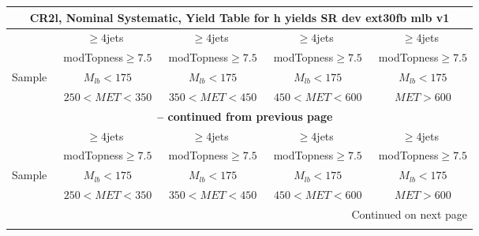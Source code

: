 \documentclass{article}
\begin{document}
 
 
\begin{longtable}{|l|c|c|c|c|} 
 
\multicolumn{5}{c}{ CR2l, Nominal Systematic, Yield Table for h yields SR dev ext30fb mlb v1 }\\* \hline 
  & $\ge4$jets  & $\ge4$jets  & $\ge4$jets  & $\ge4$jets \\* 
  & ~modTopness$\ge7.5$  & ~modTopness$\ge7.5$  & ~modTopness$\ge7.5$  & ~modTopness$\ge7.5$ \\* 
Sample  & ~$M_{lb}<175$  & ~$M_{lb}<175$  & ~$M_{lb}<175$  & ~$M_{lb}<175$ \\* 
  & ~$250<MET<350$  & ~$350<MET<450$  & ~$450<MET<600$  & ~$MET>600$ \\* 
\hline \hline 
\endfirsthead 
 
\multicolumn{5}{c}{{\bfseries \tablename\ \thetable{} -- continued from previous page}}\\* \hline 
  & $\ge4$jets  & $\ge4$jets  & $\ge4$jets  & $\ge4$jets \\* 
  & ~modTopness$\ge7.5$  & ~modTopness$\ge7.5$  & ~modTopness$\ge7.5$  & ~modTopness$\ge7.5$ \\* 
Sample  & ~$M_{lb}<175$  & ~$M_{lb}<175$  & ~$M_{lb}<175$  & ~$M_{lb}<175$ \\* 
  & ~$250<MET<350$  & ~$350<MET<450$  & ~$450<MET<600$  & ~$MET>600$ \\* 
\hline \hline 
\endhead 
 
\multicolumn{5}{|r|}{{Continued on next page}}\\* \hline 
\endfoot 
 
 
\endlastfoot 
 

\end{longtable}
\end{document}
